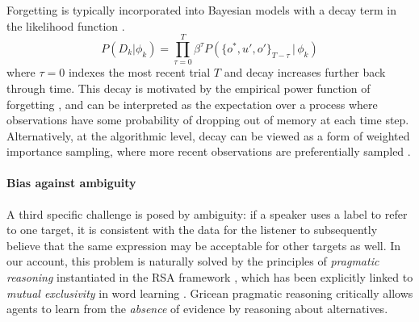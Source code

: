 
Forgetting is typically incorporated into Bayesian models with a decay term in the likelihood function \cite{anderson2000adaptive,angela2009sequential,fudenberg2014recency,kalm2018visual}.
$$P(D_k | \phi_k) = \prod_{\tau=0}^T \beta^{\tau} P(\{o^*,u',o'\}_{T-\tau}\, |\, \phi_k)$$
where $\tau=0$ indexes the most recent trial $T$ and decay increases further back through time.
This decay is motivated by the empirical power function of forgetting \cite{wixted1991form}, and can be interpreted as the expectation over a process where observations have some probability of dropping out of memory at each time step.
Alternatively, at the algorithmic level, decay can be viewed as a form of weighted importance sampling, where more recent observations are preferentially sampled \cite{pearl2010online}.

\paragraph{Bias against ambiguity}

A third specific challenge is posed by ambiguity: if a speaker uses a label to refer to one target, it is consistent with the data for the listener to subsequently believe that the same expression may be acceptable for other targets as well. 
In our account, this problem is naturally solved by the principles of \textit{pragmatic reasoning} instantiated in the RSA framework \cite{Grice75_LogicConversation}, which has been explicitly linked to \emph{mutual exclusivity} in word learning \cite{bloom2002children,FrankGoodmanTenenbaum09_Wurwur,SmithGoodmanFrank13_RecursivePragmaticReasoningNIPS,gulordava2020one,ohmerreinforcement}.
Gricean pragmatic reasoning critically allows agents to learn from the \emph{absence} of evidence by reasoning about alternatives. 

